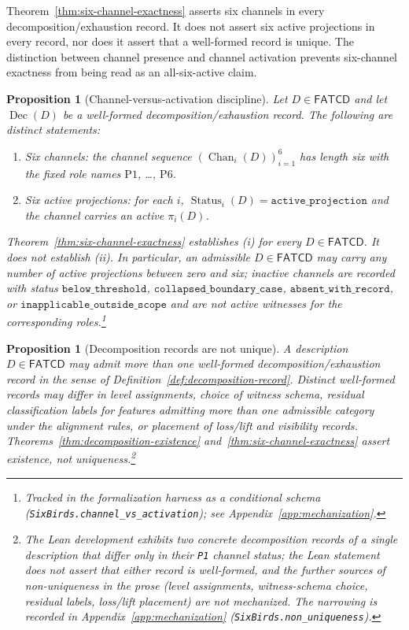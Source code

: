 \documentclass[11pt]{article}
\newtheorem{proposition}[theorem]{Proposition}
\theoremstyle{definition}
\newcommand{\FATCD}{\ensuremath{\mathsf{FATCD}}}
\newcommand{\Dec}[1]{\ensuremath{\operatorname{Dec}\!\left(#1\right)}}
\newcommand{\Chan}[2]{\ensuremath{\operatorname{Chan}_{#1}\!\left(#2\right)}}
\newcommand{\Status}[2]{\ensuremath{\operatorname{Status}_{#1}\!\left(#2\right)}}
\newcommand{\activeproj}{\texttt{active\_projection}}
\newcommand{\belowthr}{\texttt{below\_threshold}}
\newcommand{\collapsedbc}{\texttt{collapsed\_boundary\_case}}
\newcommand{\absentrec}{\texttt{absent\_with\_record}}
\newcommand{\outsidescope}{\texttt{inapplicable\_outside\_scope}}
\newcommand{\Pone}{\ensuremath{\mathrm{P1}}}
\newcommand{\Psix}{\ensuremath{\mathrm{P6}}}
\begin{document}
Theorem~\ref{thm:six-channel-exactness} asserts six channels in every
decomposition/exhaustion record. It does not assert six active
projections in every record, nor does it assert that a well-formed
record is unique. The distinction between channel presence and
channel activation prevents six-channel exactness from being read as
an all-six-active claim.

\begin{proposition}[Channel-versus-activation discipline]\label{prop:channel-vs-activation}
Let \(D \in \FATCD{}\) and let \(\Dec{D}\) be a well-formed decomposition/exhaustion
record. The following are distinct statements:
\begin{enumerate}[label=(\roman*),topsep=2pt,itemsep=1pt]
  \item \emph{Six channels}: the channel sequence
    \((\Chan{i}{D})_{i=1}^{6}\) has length six with the fixed role names
    \Pone{}, \ldots, \Psix{}.
  \item \emph{Six active projections}: for each \(i\),
    \(\Status{i}{D} = \activeproj\) and the channel carries an active
    \(\pi_i(D)\).
\end{enumerate}
Theorem~\ref{thm:six-channel-exactness} establishes (i) for every
\(D \in \FATCD{}\). It does not establish (ii). In particular, an
admissible \(D \in \FATCD{}\) may carry any number of active projections
between zero and six; inactive channels are recorded with status
\(\belowthr\), \(\collapsedbc\), \(\absentrec\), or \(\outsidescope\)
and are not active witnesses for the corresponding roles.\footnote{Tracked in the formalization harness as a conditional schema (\texttt{SixBirds.channel\_vs\_activation}); see Appendix~\ref{app:mechanization}.}
\end{proposition}

\begin{proposition}[Decomposition records are not unique]\label{prop:non-uniqueness}
A description \(D \in \FATCD{}\) may admit more than one well-formed
decomposition/exhaustion record in the sense of
Definition~\ref{def:decomposition-record}. Distinct well-formed records
may differ in level assignments, choice of witness schema, residual
classification labels for features admitting more than one admissible
category under the alignment rules, or placement of loss/lift and
visibility records. Theorems~\ref{thm:decomposition-existence}
and~\ref{thm:six-channel-exactness} assert existence, not uniqueness.\footnote{The Lean development exhibits two concrete decomposition records of a single description that differ only in their \texttt{P1} channel status; the Lean statement does not assert that either record is well-formed, and the further sources of non-uniqueness in the prose (level assignments, witness-schema choice, residual labels, loss/lift placement) are not mechanized. The narrowing is recorded in Appendix~\ref{app:mechanization} (\texttt{SixBirds.non\_uniqueness}).}
\end{proposition}
\end{document}
